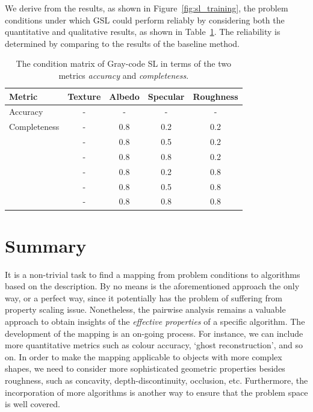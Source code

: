 We derive from the results, as shown in Figure~\ref{fig:sl_training}, the problem conditions under which GSL could perform reliably by considering both the quantitative and qualitative results, as shown in Table~\ref{tab:sl_training_result}. The reliability is determined by comparing to the results of the baseline method.
\begin{table}[!htbp]
  \centering
  \begin{tabular}{l*{4}{c}}
  \hline
  \textbf{Metric} & Texture & Albedo & Specular & Roughness\\
  \hline
  Accuracy     & - & - & - & -\\
  \hline
  Completeness & - & 0.8 & 0.2 & 0.2\\
               & - & 0.8 & 0.5 & 0.2\\
               & - & 0.8 & 0.8 & 0.2\\
               & - & 0.8 & 0.2 & 0.8\\
               & - & 0.8 & 0.5 & 0.8\\
               & - & 0.8 & 0.8 & 0.8\\
  \hline
  \end{tabular}
  \caption{The condition matrix of Gray-code SL in terms of the two metrics \textit{accuracy} and \textit{completeness}.}
  \label{tab:sl_training_result}
\end{table}

\section{Summary}
It is a non-trivial task to find a mapping from problem conditions to algorithms based on the description. By no means is the aforementioned approach the only way, or a perfect way, since it potentially has the problem of suffering from property scaling issue. Nonetheless, the pairwise analysis remains a valuable approach to obtain insights of the \textit{effective properties} of a specific algorithm. The development of the mapping is an on-going process. For instance, we can include more quantitative metrics such as colour accuracy, `ghost reconstruction', and so on. In order to make the mapping applicable to objects with more complex shapes, we need to consider more sophisticated geometric properties besides roughness, such as concavity, depth-discontinuity, occlusion, etc. Furthermore, the incorporation of more algorithms is another way to ensure that the problem space is well covered.
